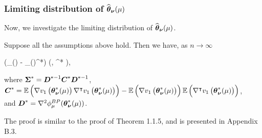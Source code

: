 \subsubsection{Limiting distribution of $\widehat{\boldsymbol{\theta}}_{\boldsymbol{\nu}}(\mu)$}
Now, we investigate the limiting distribution of $\widehat{\boldsymbol{\theta}}_{\boldsymbol{\nu}}(\mu)$.
\begin{theorem}
	Suppose all the assumptions above hold. Then we have, as $n\to \infty$
	\begin{flalign*}
	(\wh{\bs{\theta}}_{\bs{\nu}}(\mu) - \bs{\theta}_{\bs{\nu}}(\mu)^*)  \lt(, \bs{\Sigma}^* \rt),
	\end{flalign*}
	where $\boldsymbol{\Sigma}^* = \boldsymbol{D}^{*-1}\boldsymbol{C}^{*}\boldsymbol{D}^{*-1}$, \\
		$\boldsymbol{C}^* =\mathbb{E}\left( \nabla v_1\left(\boldsymbol{\theta}^*_{\boldsymbol{\nu}}(\mu)\right)\nabla^{\intercal} v_1\left(\boldsymbol{\theta}^*_{\boldsymbol{\nu}}(\mu)\right) \right) - \mathbb{E}\left(\nabla v_1\left(\boldsymbol{\theta}^*_{\boldsymbol{\nu}}(\mu)\right)\right) \mathbb{E}\left(\nabla^{\intercal} v_1\left(\boldsymbol{\theta}^*_{\boldsymbol{\nu}}(\mu)\right)\right)$,\\
	and $\boldsymbol{D}^*  =  \nabla^2 \phi^{BP}_{\mu}(\boldsymbol{\theta}^*_{\boldsymbol{\nu}}(\mu))$.
\end{theorem}
The proof is similar to the proof of Theorem 1.1.5, and is presented in Appendix B.3.
